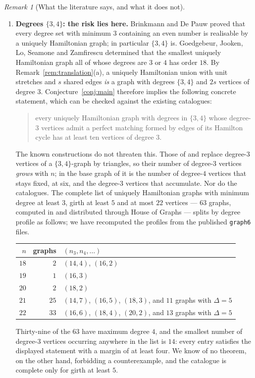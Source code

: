 \documentclass[11pt,a4paper]{article}
\theoremstyle{definition}
\theoremstyle{remark}
\newtheorem{remark}[theorem]{Remark}
\begin{document}
\begin{remark}[What the literature says, and what it does not]
\begin{enumerate}[label=(\arabic*)]
\item \textbf{Degrees $\{3,4\}$: the risk lies here.} Brinkmann and De Pauw \cite{bdp24} proved that every degree set with minimum $3$ containing an even number is realisable by a uniquely Hamiltonian graph; in particular $\{3,4\}$ is. Goedgebeur, Jooken, Lo, Seamone and Zamfirescu \cite{gjlsz} determined that the smallest uniquely Hamiltonian graph all of whose degrees are $3$ or $4$ has order $18$. By Remark~\ref{rem:translation}(a), a uniquely Hamiltonian union with unit stretches and $s$ shared edges \emph{is} a graph with degrees $\{3,4\}$ and $2s$ vertices of degree $3$. Conjecture~\ref{conj:main} therefore implies the following concrete statement, which can be checked against the existing catalogues:
\begin{quote}
every uniquely Hamiltonian graph with degrees in $\{3,4\}$ whose degree-$3$ vertices admit a perfect matching formed by edges of its Hamilton cycle has at least ten vertices of degree $3$.
\end{quote}
The known constructions do not threaten this. Those of \cite{gjlsz} and \cite{bdp24} replace degree-$3$ vertices of a $\{3,4\}$-graph by triangles, so their number of degree-$3$ vertices \emph{grows} with $n$; in the base graph of \cite[Lemma~3.6]{bdp24} it is the number of degree-$4$ vertices that stays fixed, at six, and the degree-$3$ vertices that accumulate. Nor do the catalogues. The complete list of uniquely Hamiltonian graphs with minimum degree at least $3$, girth at least $5$ and at most $22$ vertices --- $63$ graphs, computed in \cite{gmz20} and distributed through House of Graphs \cite{hog} --- splits by degree profile as follows; we have recomputed the profiles from the published \texttt{graph6} files.
\begin{center}
\begin{tabular}{rrl}
\toprule
$n$ & graphs & $(n_3,n_4,\dots)$ \\
\midrule
$18$ & $2$  & $(14,4)$, $(16,2)$ \\
$19$ & $1$  & $(16,3)$ \\
$20$ & $2$  & $(18,2)$ \\
$21$ & $25$ & $(14,7)$, $(16,5)$, $(18,3)$, and $11$ graphs with $\Delta=5$ \\
$22$ & $33$ & $(16,6)$, $(18,4)$, $(20,2)$, and $13$ graphs with $\Delta=5$ \\
\bottomrule
\end{tabular}
\end{center}
Thirty-nine of the $63$ have maximum degree $4$, and the smallest number of degree-$3$ vertices occurring anywhere in the list is $14$: every entry satisfies the displayed statement with a margin of at least four. We know of no theorem, on the other hand, forbidding a counterexample, and the catalogue is complete only for girth at least $5$.


\end{enumerate}
\end{remark}
\end{document}
